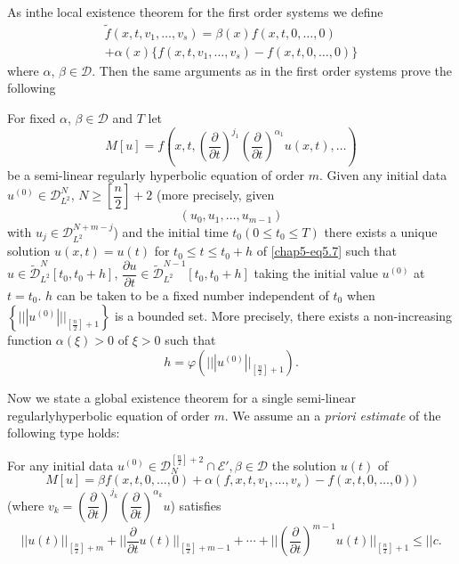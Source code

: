 As in\pageoriginale the local existence theorem for the first order
systems we define  
\begin{multline*}
\tilde{f}(x, t, v_1, \ldots, v_s)= \beta(x)f(x, t, 0, \ldots, 0)\\
+\alpha (x)\{f(x, t,v_1, \ldots,v_s)- f(x, t, 0, \ldots, 0)\} 
\end{multline*}
where $\alpha$, $\beta \in \mathscr{D}$. Then the same
arguments as in the first order systems prove the following 

\setcounter{theorem}{0}
\begin{theorem}\label{chap5-sec5-thm1}
 For fixed $\alpha$, $\beta \in \mathscr{D}$ and $T$ let  
\begin{equation*}
M [u] = f \left(x, t, \left(\frac{\partial}{\partial
  t}\right)^{j_1}\left(\frac{\partial}{\partial t}\right)^{\alpha_1} u
(x, t), \ldots \right) 
\tag{5.7} \label{chap5-eq5.7}
\end{equation*}
be a semi-linear regularly hyperbolic equation of order $m$. Given any
initial 
data $u^{(0)} \in \mathscr{D}^N_{L^2}$, $N \geq
\left[\dfrac{n}{2}\right]+2$ (more precisely, given $$
(u_0, u_1,\ldots, u_{m-1})
$$ 
with $u_j \in \mathscr{D}^{N+m-j}_{L^2}$) and the initial time
$t_0 (0 \leq t_0 \leq T)$ there exists a unique solution $u(x, t) =
u(t)$ for $t_0 \leq t \leq t_0 + h$ of \eqref{chap5-eq5.7} such that $u
\in \tilde{\mathscr{D}}^N_{L^2} [t_0, t_0 + h]$,
$\dfrac{\partial u}{\partial t} \in
\tilde{\mathscr{D}}^{N-1}_{L^2} [ t_0, t_0 +h]$ taking the initial
value $u^{(0)}$ at $t= t_0$. $h$ can be taken to be a fixed number
independent of $t_0$ when $\left\{ ||| u^{(0)}
|||_{\left[\frac{n}{2}\right]+1} \right\}$ is 
a bounded set. More precisely, there exists a non-increasing function
$\alpha(\xi) > 0$ of $\xi > 0$ such that 
$$
h = \varphi \left(|| |u^{(0)}||_{\left[\frac{n}{2}\right]+1}\right).
$$
\end{theorem}

Now we state a global existence theorem for a single semi-linear
regularly\pageoriginale hyperbolic equation of order $m$. We assume an
a \textit{priori estimate} of the following type holds:  

For any initial data $u^{(0)} \in
\mathscr{D}^{\left[\frac{n}{2} \right] +
  2}_N  \cap \mathscr{E}', \beta \in \mathscr{D}$ the solution  
$u(t)$ of  
\begin{equation*}  
 M[ u ] = \beta f(x, t, 0, \ldots, 0) + \alpha (f,x, t, v_1,
\ldots, v_s) - f(x, t, 0, \ldots, 0)) \tag{5.8}\label{chap5-eq5.8} 
\end{equation*}
(where $v_k = \left(\dfrac{\partial}{\partial t}\right)^{j_k}
\left(\dfrac{\partial}{\partial t}\right)^{\alpha_k} u$) satisfies  
\begin{equation*}
|| u (t) ||_{[\frac{n}{2}]+m} + || \frac{\partial}{\partial t} u(t)
||_{[\frac{n}{2}]+ m-1}+ \cdots + || \left(\frac{\partial}{\partial
  t}\right)^{m-1} u(t) ||_{[\frac{n}{2}]+1} \leq
||c. \tag{5.9}\label{chap5-eq5.9}  
 \end{equation*} 

